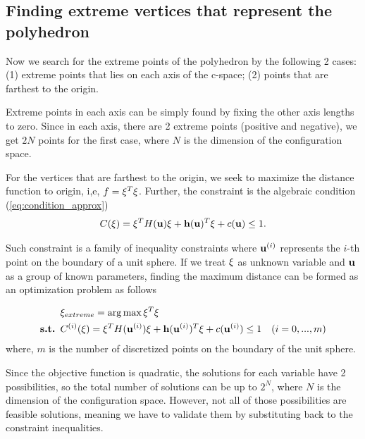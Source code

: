\documentclass{article}
\begin{document}
\subsection{Finding extreme vertices that represent the polyhedron}
Now we search for the extreme points of the polyhedron by the following 2 cases: (1) extreme points that lies on each axis of the c-space; (2) points that are farthest to the origin.

Extreme points in each axis can be simply found by fixing the other axis lengths to zero. Since in each axis, there are 2 extreme points (positive and negative), we get $2N$ points for the first case, where $N$ is the dimension of the configuration space. 

For the vertices that are farthest to the origin, we seek to maximize the distance function to origin, i,e, $f = {\bf \xi}^T {\bf \xi}$. Further, the constraint is the algebraic condition (\ref{eq:condition_approx})
\begin{equation}
C({\bf \xi}) = {\bf \xi}^T H({\bf u}) {\bf \xi} + {\bf h}({\bf u})^T {\bf \xi} + c({\bf u}) \leq 1.
\end{equation}

Such constraint is a family of inequality constraints where ${\bf u}^{(i)}$ represents the $i$-th point on the boundary of a unit sphere. If we treat ${\bf \xi}$ as unknown variable and ${\bf u}$ as a group of known parameters, finding the maximum distance can be formed as an optimization problem as follows

\begin{equation}
\begin{aligned}
& {\bf \xi}_{extreme} = \arg\max {\bf \xi}^T {\bf \xi} \\
\text{{\bf s.t.   }} & C^{(i)}({\bf \xi}) = {\bf \xi}^T H({\bf u}^{(i)}) {\bf \xi} + {\bf h}({\bf u}^{(i)})^T {\bf \xi} + c({\bf u}^{(i)}) \leq 1 & (i=0,...,m)\\
\end{aligned}
\end{equation}
where, $m$ is the number of discretized points on the boundary of the unit sphere.

Since the objective function is quadratic, the solutions for each variable have 2 possibilities, so the total number of solutions can be up to $2^N$, where $N$ is the dimension of the configuration space. However, not all of those possibilities are feasible solutions, meaning we have to validate them by substituting back to the constraint inequalities.
\end{document}
